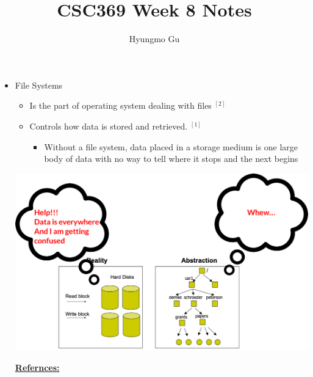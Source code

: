 \documentclass[12pt]{article}
\begin{document}
\title{CSC369 Week 8 Notes}
\author{Hyungmo Gu}
\maketitle

\begin{itemize}
    \item File Systems
    \begin{itemize}
        \item Is the part of operating system dealing with files $^{[2]}$
        \item Controls how data is stored and retrieved. $^{[1]}$
        \begin{itemize}
            \item Without a file system, data placed in a storage medium is one
            large body of data with no way to tell where it stops and the next begins
        \end{itemize}
    \end{itemize}

    \begin{center}
    \includegraphics[width=0.8\linewidth]{images/week_8_notes_1_1.png}
    \end{center}

    \bigskip

    \underline{\textbf{Refernces:}}

    \bigskip


\end{itemize}
\end{document}
